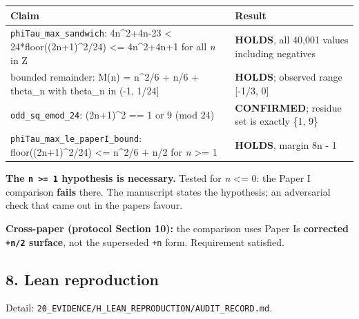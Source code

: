 \documentclass[
  9pt,
  a4paper,
]{article}
\newcounter{none} %
\begin{document}
{\def\LTcaptype{none} %
\begin{longtable}[]{@{}ll@{}}
\toprule\noalign{}
Claim & Result \\
\midrule\noalign{}
\endhead
\bottomrule\noalign{}
\endlastfoot
\texttt{phiTau\_max\_sandwich}: 4n\^{}2+4n-23 \textless{}
24*floor((2n+1)\^{}2/24) \textless= 4n\^{}2+4n+1 for all \emph{n} in Z &
\textbf{HOLDS}, all 40,001 values including negatives \\
bounded remainder: M(n) = n\^{}2/6 + n/6 + theta\_n with theta\_n in
(-1, 1/24{]} & \textbf{HOLDS}; observed range {[}-1/3, 0{]} \\
\texttt{odd\_sq\_emod\_24}: (2n+1)\^{}2 == 1 or 9 (mod 24) &
\textbf{CONFIRMED}; residue set is exactly \{1, 9\} \\
\texttt{phiTau\_max\_le\_paperI\_bound}: floor((2n+1)\^{}2/24)
\textless= n\^{}2/6 + n/2 for \emph{n} \textgreater= 1 & \textbf{HOLDS},
margin 8n - 1 \\
\end{longtable}
}

\textbf{The \texttt{n\ \textgreater{}=\ 1} hypothesis is necessary.}
Tested for \emph{n} \textless= 0: the Paper I comparison \textbf{fails}
there. The manuscript states the hypothesis; an adversarial check that
came out in the paper\textquotesingle s favour.

\textbf{Cross-paper (protocol Section 10):} the comparison uses Paper
I\textquotesingle s \textbf{corrected \texttt{+n/2} surface}, not the
superseded \texttt{+n} form. Requirement satisfied.

\subsection{8. Lean reproduction}\label{8-lean-reproduction}

Detail: \texttt{20\_EVIDENCE/H\_LEAN\_REPRODUCTION/AUDIT\_RECORD.md}.
\end{document}
